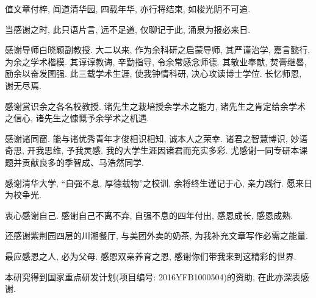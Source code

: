 \begin{acknowledgement}
值文章付梓, 闻道清华园, 四载年华, 亦行将结束, 如梭光阴不可追.

当感谢之时, 此只语片言, 远不足道, 仅聊记于此, 涌泉为报必来日.

感谢导师白晓颖副教授. 大二以来, 作为余科研之启蒙导师, 其严谨治学, 嘉言懿行, 为余之学术楷模. 其谆谆教诲, 辛勤指导, 令余常感念师德. 其敬业奉献, 焚膏继晷, 励余以奋发图强. 此三载学术生涯, 使我钟情科研, 决心攻读博士学位. 长忆师恩, 谢无尽焉.

感谢赏识余之各名校教授. 诸先生之栽培授余学术之能力, 诸先生之肯定给余学术之信心, 诸先生之慷慨予余学术之机遇.

感谢诸同窗. 能与诸优秀青年才俊相识相知, 诚本人之荣幸. 诸君之智慧博识, 妙语奇思, 开我思维, 予我灵感. 我的大学生涯因诸君而充实多彩. 尤感谢一同专研本课题并贡献良多的季智成、马浩然同学.

感谢清华大学, “自强不息, 厚德载物”之校训, 余将终生谨记于心, 亲力践行. 愿来日为校争光.

衷心感谢自己. 感谢自己不离不弃, 自强不息的四年付出, 感恩成长, 感恩成熟.

还感谢紫荆园四层的川湘餐厅, 与美团外卖的奶茶, 为我补充文章写作必需之能量.

最应感恩之人, 必为父母. 感恩双亲养育之恩, 感谢你们带我来到这精彩的世界.

本研究得到国家重点研发计划(项目编号: 2016YFB1000504)的资助, 在此亦深表感谢.

\end{acknowledgement}
